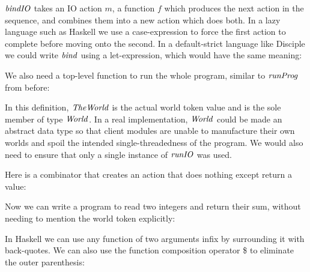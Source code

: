 $\operatorname{\mathit{bindIO}}$ takes an IO action $m$, a function $f$ which produces the next action in the sequence, and combines them into a new action which does both. In a lazy language such as Haskell we use a case-expression to force the first action to complete before moving onto the second. In a default-strict language like Disciple we could write $\operatorname{\mathit{bind}}$ using a let-expression, which would have the same meaning:


We also need a top-level function to run the whole program, similar to $\operatorname{\mathit{runProg}}$ from before:


In this definition, $\operatorname{\mathit{TheWorld}}$ is the actual world token value and is the sole member of type $\operatorname{\mathit{World}}$. In a real implementation, $\operatorname{\mathit{World}}$ could be made an abstract data type so that client modules are unable to manufacture their own worlds and spoil the intended single-threadedness of the program. We would also need to ensure that only a single instance of $\operatorname{\mathit{runIO}}$ was used.

Here is a combinator that creates an action that does nothing except return a value:


Now we can write a program to read two integers and return their sum, without needing to mention the world token explicitly:


In Haskell we can use any function of two arguments infix by surrounding it with back-quotes. We can also use the function composition operator \$ to eliminate the outer parenthesis:


